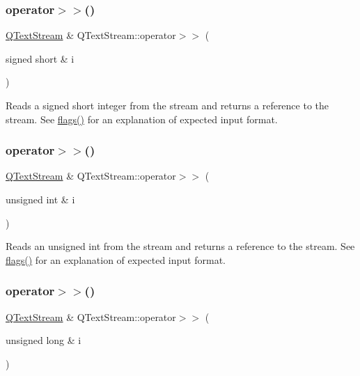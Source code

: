 \subsubsection{\texorpdfstring{operator$>$$>$()}{operator>>()}\hspace{0.1cm}{\footnotesize\ttfamily [10/13]}}
{\footnotesize\ttfamily \mbox{\hyperlink{class_q_text_stream}{Q\+Text\+Stream}} \& Q\+Text\+Stream\+::operator$>$$>$ (\begin{DoxyParamCaption}\item[{signed short \&}]{i }\end{DoxyParamCaption})}

Reads a signed {\ttfamily short} integer from the stream and returns a reference to the stream. See \mbox{\hyperlink{class_q_text_stream_ab6cf395446ba04973dff067ab8b36978}{flags()}} for an explanation of expected input format. \mbox{\label{class_q_text_stream_ae591ec4f654abd8450583b3a60a5015a}} 
\subsubsection{\texorpdfstring{operator$>$$>$()}{operator>>()}\hspace{0.1cm}{\footnotesize\ttfamily [11/13]}}
{\footnotesize\ttfamily \mbox{\hyperlink{class_q_text_stream}{Q\+Text\+Stream}} \& Q\+Text\+Stream\+::operator$>$$>$ (\begin{DoxyParamCaption}\item[{unsigned int \&}]{i }\end{DoxyParamCaption})}

Reads an unsigned {\ttfamily int} from the stream and returns a reference to the stream. See \mbox{\hyperlink{class_q_text_stream_ab6cf395446ba04973dff067ab8b36978}{flags()}} for an explanation of expected input format. \mbox{\label{class_q_text_stream_a68deb1875213bffc9334eb83c73210c2}} 
\subsubsection{\texorpdfstring{operator$>$$>$()}{operator>>()}\hspace{0.1cm}{\footnotesize\ttfamily [12/13]}}
{\footnotesize\ttfamily \mbox{\hyperlink{class_q_text_stream}{Q\+Text\+Stream}} \& Q\+Text\+Stream\+::operator$>$$>$ (\begin{DoxyParamCaption}\item[{unsigned long \&}]{i }\end{DoxyParamCaption})}

